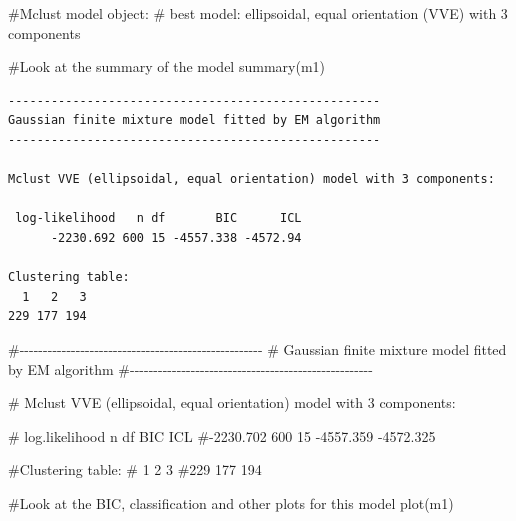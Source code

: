 \documentclass{article}
\newenvironment{Shaded}{\begin{snugshade}}{\end{snugshade}}
\newcommand{\CommentTok}[1]{\textcolor[rgb]{0.37,0.37,0.37}{#1}}
\newcommand{\FunctionTok}[1]{\textcolor[rgb]{0.28,0.35,0.67}{#1}}
\newcommand{\NormalTok}[1]{\textcolor[rgb]{0.00,0.23,0.31}{#1}}
\begin{document}
\begin{Shaded}
\begin{Highlighting}[]
\CommentTok{\#\textquotesingle{}Mclust\textquotesingle{} model object:}
\CommentTok{\#  best model: ellipsoidal, equal orientation (VVE) with 3 components}

\CommentTok{\#Look at the summary of the model}
\FunctionTok{summary}\NormalTok{(m1)}
\end{Highlighting}
\end{Shaded}

\begin{verbatim}
---------------------------------------------------- 
Gaussian finite mixture model fitted by EM algorithm 
---------------------------------------------------- 

Mclust VVE (ellipsoidal, equal orientation) model with 3 components: 

 log-likelihood   n df       BIC      ICL
      -2230.692 600 15 -4557.338 -4572.94

Clustering table:
  1   2   3 
229 177 194 
\end{verbatim}

\begin{Shaded}
\end{Shaded}

\begin{Shaded}
\begin{Highlighting}[]
\CommentTok{\#{-}{-}{-}{-}{-}{-}{-}{-}{-}{-}{-}{-}{-}{-}{-}{-}{-}{-}{-}{-}{-}{-}{-}{-}{-}{-}{-}{-}{-}{-}{-}{-}{-}{-}{-}{-}{-}{-}{-}{-}{-}{-}{-}{-}{-}{-}{-}{-}{-}{-}{-}{-}}
\CommentTok{\#  Gaussian finite mixture model fitted by EM algorithm }
\CommentTok{\#{-}{-}{-}{-}{-}{-}{-}{-}{-}{-}{-}{-}{-}{-}{-}{-}{-}{-}{-}{-}{-}{-}{-}{-}{-}{-}{-}{-}{-}{-}{-}{-}{-}{-}{-}{-}{-}{-}{-}{-}{-}{-}{-}{-}{-}{-}{-}{-}{-}{-}{-}{-}}
  
\CommentTok{\#  Mclust VVE (ellipsoidal, equal orientation) model with 3 components:}
  
\CommentTok{\#  log.likelihood   n df       BIC       ICL}
\CommentTok{\#{-}2230.702 600 15 {-}4557.359 {-}4572.325}

\CommentTok{\#Clustering table:}
\CommentTok{\#  1   2   3 }
\CommentTok{\#229 177 194 }

\CommentTok{\#Look at the BIC, classification and other plots for this model}
\FunctionTok{plot}\NormalTok{(m1)}
\end{Highlighting}
\end{Shaded}
\end{document}
